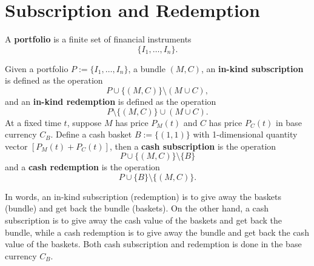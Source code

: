 \documentclass[11pt,fleqn]{book} %
\begin{document}

\section{Subscription and Redemption}

\begin{definition} \label{def:121}
A \textbf{portfolio} is a finite set of financial instruments
\[
\{I_1, \ldots, I_n\}.
\]
\end{definition}

\begin{definition} \label{def:122}
Given a portfolio \(P := \{I_1, \ldots, I_n\}\), a bundle \((M, C)\), an \textbf{in-kind subscription} is defined as the operation
\[
P \cup \{(M, C)\} \setminus (M \cup C),
\]
and an \textbf{in-kind redemption} is defined as the operation
\[
P \setminus \{(M, C)\} \cup (M \cup C).
\]
\indent At a fixed time \(t\), suppose \(M\) has price \(P_M(t)\) and \(C\) has price \(P_C(t)\) in base currency
\(C_B\). Define a cash basket \(B := \{(1, 1)\}\) with 1-dimensional quantity vector \([P_M(t) + P_C(t)]\), then a \textbf{cash subscription} is the operation
\[
P \cup \{(M, C)\} \setminus \{B\}
\]
and a \textbf{cash redemption} is the operation
\[
P \cup \{B\} \setminus \{(M, C)\}.
\]
\end{definition}

\begin{remark} \label{rmk:123}
In words, an in-kind subscription (redemption) is to give away the baskets (bundle) and get back the bundle
(baskets). On the other hand, a cash subscription is to give away the cash value of the baskets and get back the
bundle, while a cash redemption is to give away the bundle and get back the cash value of the baskets. Both cash
subscription and redemption is done in the base currency \(C_B\).
\end{remark}





\end{document}

